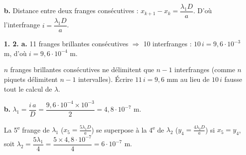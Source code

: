 \documentclass[11pt]{article}
\begin{document}
\textbf{b.} Distance entre deux franges consécutives : $x_{k+1} - x_k = \dfrac{\lambda_1 D}{a}$. D'où l'interfrange $i = \dfrac{\lambda_1 D}{a}$.

\textbf{1. 2. a.} 11 franges brillantes consécutives $\Rightarrow$ 10 interfranges : $10\,i = 9{,}6\cdot10^{-3}$ m, d'où $i = 9{,}6\cdot10^{-4}$ m.

\begin{piege}
$n$ franges brillantes consécutives ne délimitent que $n - 1$
interfranges (comme $n$ piquets délimitent $n - 1$ intervalles). Écrire
$11\,i = 9{,}6$ mm au lieu de $10\,i$ fausse tout le calcul de
$\lambda$.
\end{piege}

\textbf{b.} $\lambda_1 = \dfrac{i\,a}{D} = \dfrac{9{,}6\cdot10^{-4}\times 10^{-3}}{2} = 4{,}8\cdot10^{-7}$ m.

 La 5\textsuperscript{e} frange de $\lambda_1$ ($x_5 = \frac{5\lambda_1 D}{a}$) se superpose à la 4\textsuperscript{e} de $\lambda_2$ ($y_4 = \frac{4\lambda_2 D}{a}$) si $x_5 = y_4$, soit $\lambda_2 = \dfrac{5\lambda_1}{4} = \dfrac{5\times 4{,}8\cdot10^{-7}}{4} = 6\cdot10^{-7}$ m.
\end{document}
